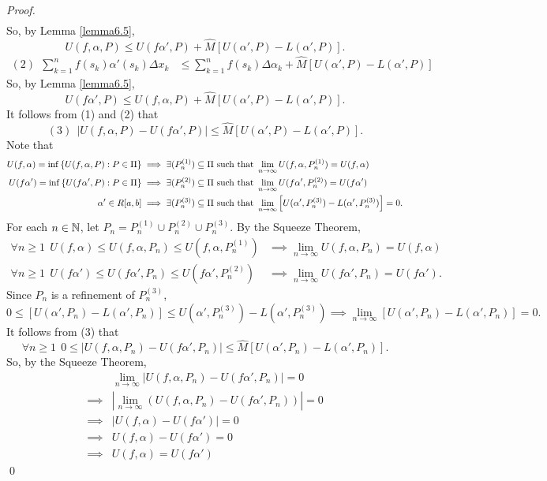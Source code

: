 \begin{proof}
\begin{align*}
    \end{align*}
    So, by Lemma \ref{lemma6.5},
    $$U(f, \alpha, P) \leq U(f\alpha', P) + \hat{M}\left[U(\alpha', P) - L(\alpha', P)\right].$$
    \begin{align*}
        (2)~~ \sum_{k=1}^{n}f(s_k)\alpha'(s_k) \Delta x_k &\leq \sum_{k=1}^{n}f(s_k) \Delta \alpha_k + \hat{M}\left[U(\alpha', P)-L(\alpha', P)\right]
    \end{align*}
    So, by Lemma \ref{lemma6.5},
    $$U(f\alpha', P) \leq U(f, \alpha, P) + \hat{M}\left[U(\alpha', P)-L(\alpha',P)\right].$$
    It follows from (1) and (2) that 
    $$(3)~~ \left|U(f, \alpha, P) - U(f\alpha', P)\right| \leq \hat{M}\left[U(\alpha', P) - L(\alpha', P)\right].$$
    Note that
    \begin{align*}
        U(f, \alpha) = \inf\left\{U(f, \alpha, P) : P \in \Pi\right\} &\implies \exists (P^{(1)}_n)\subseteq \Pi \text{ such that } \lim_{n \to \infty}U(f, \alpha, P^{(1)}_n) = U(f, \alpha) \\
        U(f\alpha') = \inf\left\{U(f\alpha',P) : P \in \Pi\right\} &\implies \exists (P^{(2)}_n)\subseteq \Pi \text{ such that } \lim_{n\to \infty} U(f\alpha', P^{(2)}_n) = U(f\alpha') \\
        \alpha' \in R[a,b] &\implies \exists (P^{(3)}_n) \subseteq \Pi \text{ such that } \lim_{n\to \infty}\left[U(\alpha', P^{(3)}_n)-L(\alpha', P^{(3)}_n)\right] = 0.
    \end{align*}
    For each $n \in \mathbb{N}$, let $P_n = P^{(1)}_n \cup P^{(2)}_n \cup P^{(3)}_n.$ By the Squeeze Theorem,
    \begin{align*}
        \forall n \geq 1 ~~U(f, \alpha) \leq U(f, \alpha, P_n) \leq U(f, \alpha, P^{(1)}_n) &\implies \lim_{n\to \infty} U(f, \alpha, P_n) = U(f, \alpha) \\ 
        \forall n \geq 1 ~~U(f\alpha') \leq U(f\alpha', P_n) \leq U(f\alpha', P^{(2)}_n) &\implies \lim_{n \to \infty} U(f\alpha', P_n) = U(f\alpha').
    \end{align*}
    Since $P_n$ is a refinement of $P^{(3)}_n$,
    $$0 \leq \left[U(\alpha', P_n) - L(\alpha', P_n)\right] \leq U(\alpha', P^{(3)}_n) - L(\alpha', P^{(3)}_n) \implies \lim_{n \to \infty} \left[U(\alpha', P_n)-L(\alpha', P_n)\right] = 0.$$
    It follows from (3) that 
    $$\forall n \geq 1 ~~0 \leq \left|U(f, \alpha, P_n) - U(f\alpha', P_n)\right| \leq \hat{M}\left[U(\alpha', P_n) - L(\alpha', P_n)\right].$$
    So, by the Squeeze Theorem,
    \begin{align*}
        &\lim_{n\to \infty}\left|U(f, \alpha, P_n) - U(f\alpha', P_n)\right| = 0 \\
        \implies &\left|\lim_{n\to \infty}\left(U(f, \alpha, P_n) - U(f\alpha', P_n)\right)\right| = 0 \\
        \implies &\left|U(f, \alpha) - U(f\alpha')\right| = 0 \\
        \implies &U(f, \alpha) - U(f\alpha') = 0 \\
        \implies &U(f,\alpha) = U(f\alpha') 
    \end{align*}
    \qed
\end{proof}

